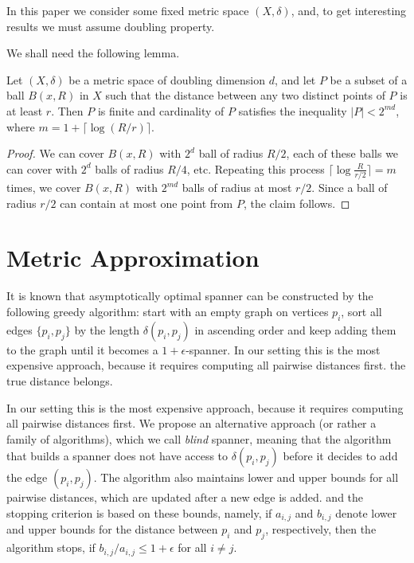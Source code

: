 \documentclass[a4paper,USenglish]{socg-lipics-v2018}
\newcommand{\eps}{\epsilon}
\newcommand{\dist}{\delta}
\begin{document}
In this paper we consider some fixed metric space $(X, \dist)$, and, to get interesting
results we must assume doubling property.

We shall need the following lemma.

\begin{lemma}
\label{lem:packing_lemma_dd}
Let $(X,\dist)$ be a metric space of doubling dimension $d$, and let $P$ be a subset of a ball $B(x,R)$ in $X$ such that the distance between any two distinct points of $P$ is at least $r$.
Then $P$ is finite and cardinality of $P$ satisfies the inequality $|P| < 2^{md}$, where $m = 1 + \lceil \log (R/r) \rceil $. 
\end{lemma}

\begin{proof}
We can cover $B(x,R)$ with $2^d$ ball of radius $R/2$, each of these balls we can cover with $2^d$
balls of radius $R/4$, etc. Repeating this process $\lceil \log \frac{R}{r/2} \rceil = m $ times, 
we cover
$B(x, R)$ with $2^{md}$ balls of radius at most $r/2$. Since a ball of radius $r/2$ can contain at most one point from $P$, the claim follows.
\end{proof}


\section{Metric Approximation}

It is known that asymptotically optimal spanner can be constructed by the following greedy algorithm: 
start with an empty graph on vertices $p_i$,
sort all edges $\{p_i, p_j\}$ by the length $\dist(p_i, p_j)$ in ascending order and keep adding them to the graph
until it becomes a $1+\eps$-spanner. In our setting this is the most expensive approach, because it requires
computing all pairwise distances first.
the true distance belongs.


 In our setting this is the most expensive approach, because it requires
 computing all pairwise distances first. We propose an alternative approach (or rather a family of algorithms), which we call
 \textit{blind} spanner, meaning that the algorithm that builds a spanner does not have access to $\dist(p_i, p_j)$
 before it decides to add the edge $(p_i, p_j)$.
 The algorithm also maintains lower and upper bounds
 for all pairwise distances, which are updated after a new edge is added. and the stopping criterion
 is based on these bounds, namely, if $a_{i, j}$ and $b_{i,j}$ denote lower and upper bounds
 for the distance between $p_i$ and $p_j$, respectively, then the algorithm stops, if $b_{i,j} / a_{i, j} \leq 1 + \eps$
 for all $i \neq j$.
\end{document}
